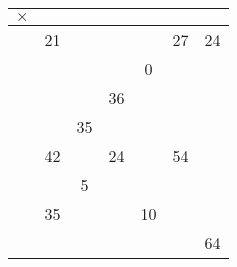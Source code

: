 \begin{center}
  \begin{tabular}{|>{}*{7}{c|}}
\hline
{}$\times$&&&&&&\\
\hline
&21&&&&27&24\\
\hline
&&&&0&&\\
\hline
\phantom{15}&&&36&&&\\
\hline
&&35&&&&\\
\hline
&42&&24&&54&\\
\hline
&&5&&&&\\
\hline
&35&&&10&&\\
\hline
&&&&&&64\\
\hline
  \end{tabular}
\end{center}
